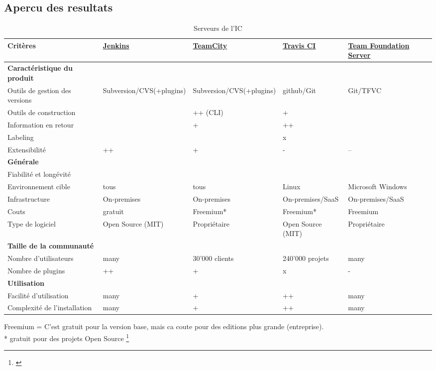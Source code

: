 \newpage
\begin{landscape}
\subsection{Apercu des resultats}
\begin{table}[H]
	\centering
		\begin{tabular}{lp{4cm}p{4cm}p{4cm}p{4cm}} \toprule
			\textbf{Critères} & \href{https://jenkins-ci.org}{\textbf{Jenkins}} & \href{https://www.jetbrains.com/teamcity/}{\textbf{TeamCity}} & \href{https://travis-ci.org}{\textbf{Travis CI}} & \href{https://www.visualstudio.com/en-us/products/tfs-overview-vs.aspx}{\textbf{Team Foundation Server}} \\ \midrule
			\rowcolor{GrayRow}\textbf{Caractéristique du produit} &  &  &  &  \\ \midrule[0.16em]
			Outils de gestion des versions & Subversion/CVS(+plugins) & Subversion/CVS(+plugins) & github/Git & Git/TFVC \\ \midrule
			Outils de construction & & ++ (CLI) & + & \\ \midrule
			Information en retour & & + & ++ & \\ \midrule
			Labeling & & \checkmark & x & \\ \midrule
			Extensibilité & ++ & + & - & -- \\ \midrule
			\rowcolor{GrayRow}\textbf{Générale} &  &  &  &  \\ \midrule[0.16em]
			Fiabilité et longévité & \checkmark & \checkmark & \checkmark & \checkmark \\ \midrule
			Environnement cible & tous & tous & Linux & Microsoft Windows \\ \midrule
			Infrastructure & On-premises & On-premises & On-premises/SaaS & On-premises/SaaS \\ \midrule
			Couts & gratuit & Freemium* & Freemium* & Freemium \\ \midrule
			Type de logiciel & Open Source (MIT) & Propriétaire & Open Source (MIT) & Propriétaire \\ \midrule
			\rowcolor{GrayRow}\textbf{Taille de la communauté} & & & & \\ \midrule[0.16em]
			Nombre d'utilisateurs & many & 30'000 clients & 240'000 projets & many \\ \midrule
			Nombre de plugins & ++ & + & x & - \\ \midrule
			\rowcolor{GrayRow}\textbf{Utilisation} &  &  &  &  \\ \midrule[0.16em]
			Facilité d'utilisation & many & + & ++ & many \\ \midrule
			Complexité de l'installation & many & + & ++ & many \\
			\bottomrule[0.16em]
		\end{tabular}
	\caption{Serveurs de l'IC}
	\label{tab:serveurs_eval}
\end{table}
Freemium = C'est gratuit pour la version base, mais ca coute pour des editions plus grande (entreprise).\\
* gratuit pour des projets Open Source
\footnote{\citep{jenkinsplugins} \citep{teamcityenv} \citep{tfsversioncontrol}}

\end{landscape}
